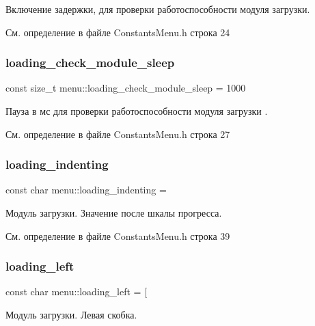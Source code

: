 Включение задержки, для проверки работоспособности модуля загрузки. 

См. определение в файле Constants\+Menu.\+h строка 24

\mbox{\label{namespacemenu_a69bce854c4a150920a5c77eede8cab0a}} 
\subsubsection{\texorpdfstring{loading\+\_\+check\+\_\+module\+\_\+sleep}{loading\_check\_module\_sleep}}
{\footnotesize\ttfamily const size\+\_\+t menu\+::loading\+\_\+check\+\_\+module\+\_\+sleep = 1000}

Пауза в мс для проверки работоспособности модуля загрузки . 

См. определение в файле Constants\+Menu.\+h строка 27

\mbox{\label{namespacemenu_ad004c327a8a1c14388a6c7f23d6953a6}} 
\subsubsection{\texorpdfstring{loading\+\_\+indenting}{loading\_indenting}}
{\footnotesize\ttfamily const char menu\+::loading\+\_\+indenting = \textquotesingle{} \textquotesingle{}}

Модуль загрузки. Значение после шкалы прогресса. 

См. определение в файле Constants\+Menu.\+h строка 39

\mbox{\label{namespacemenu_a56af6a2d586e2b6baa4ebf128a690266}} 
\subsubsection{\texorpdfstring{loading\+\_\+left}{loading\_left}}
{\footnotesize\ttfamily const char menu\+::loading\+\_\+left = \textquotesingle{}\mbox{[}\textquotesingle{}}

Модуль загрузки. Левая скобка. 

